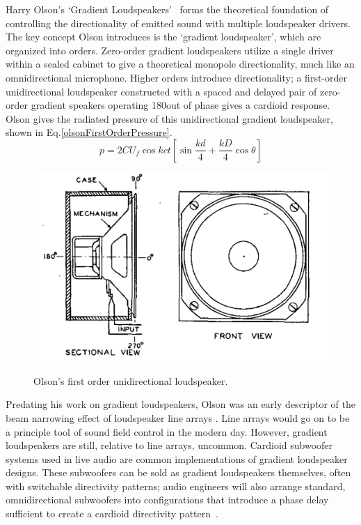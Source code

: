 \documentclass{report}
\begin{document}
    Harry Olson's `Gradient Loudspeakers'~\cite{olson1973gradient} forms the theoretical foundation of controlling the directionality of emitted sound with multiple loudspeaker drivers.
    The key concept Olson introduces is the `gradient loudspeaker', which are organized into orders.
    Zero-order gradient loudspeakers utilize a single driver within a sealed cabinet to give a theoretical monopole directionality, much like an omnidirectional microphone.
    Higher orders introduce directionality; a first-order unidirectional loudspeaker constructed with a spaced and delayed pair of zero-order gradient speakers operating 180\degree\@ out of phase gives a cardioid response.
    Olson gives the radiated pressure of this unidirectional gradient loudspeaker, shown in Eq.\ref{olsonFirstOrderPressure}.
    \begin{equation}
        p = 2CU_f\cos{kct}[\sin{\frac{kd}{4}+\frac{kD}{4}\cos{\theta}}]
        \label{olsonFirstOrderPressure}
    \end{equation}
    \begin{figure}[H]
        \centering
        \includegraphics[scale=0.2]{figs/olsonFirstOrder.png}%
        \caption{Olson's first order unidirectional loudspeaker.}\cite{olson1973gradient}
        \label{olsonFirstOrderDiagram}
    \end{figure}
    Predating his work on gradient loudspeakers, Olson was an early descriptor of the beam narrowing effect of loudspeaker line arrays \cite{olson1957acoustical}.
    Line arrays would go on to be a principle tool of sound field control in the modern day.
    However, gradient loudspeakers are still, relative to line arrays, uncommon.
    Cardioid subwoofer systems used in live audio are common implementations of gradient loudspeaker designs.
    These subwoofers can be sold as gradient loudspeakers themselves, often with switchable directivity patterns; audio engineers will also arrange standard, omnidirectional subwoofers into configurations that introduce a phase delay sufficient to create a cardioid directivity pattern~\cite{curtis2022cardioidsubs}.
\end{document}
